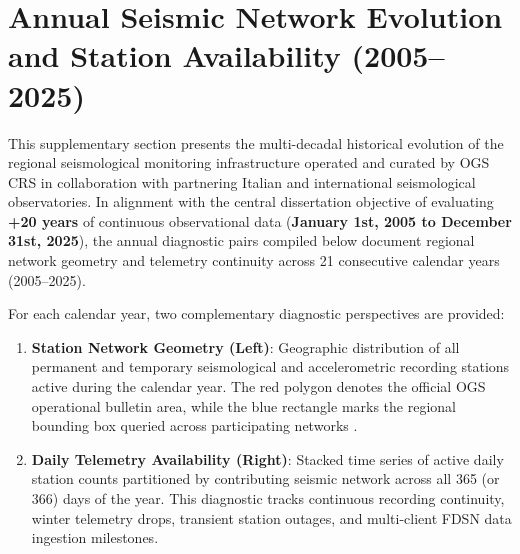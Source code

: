 
\section*{Annual Seismic Network Evolution and Station Availability
(2005--2025)}
\label{sec:supp_datasets}
\label{sec:supp_annual_ogs_network}

This supplementary section presents the multi-decadal historical evolution of
the regional seismological monitoring infrastructure operated and curated by
\ac{OGS} \acf{CRS} in collaboration with partnering Italian and international
seismological observatories. In alignment with the central dissertation
objective of evaluating \textbf{+20 years} of continuous observational data
(\textbf{January 1st, 2005 to December 31st, 2025}), the annual diagnostic
pairs compiled below document regional network geometry and telemetry
continuity across 21 consecutive calendar years (2005--2025).

For each calendar year, two complementary diagnostic perspectives are provided:
\begin{enumerate}[leftmargin=*,itemsep=2pt]
  \item \textbf{Station Network Geometry (Left)}: Geographic distribution of
    all permanent and temporary seismological and accelerometric recording
    stations active during the calendar year. The red polygon denotes the
    official \ac{OGS} operational bulletin area, while the blue rectangle
    marks the regional bounding box queried across participating networks
    .
  \item \textbf{Daily Telemetry Availability (Right)}: Stacked time series of
    active daily station counts partitioned by contributing seismic network
    across all 365 (or 366) days of the year. This diagnostic tracks continuous
    recording continuity, winter telemetry drops, transient station outages,
    and multi-client \ac{FDSN} data ingestion milestones.
\end{enumerate}

